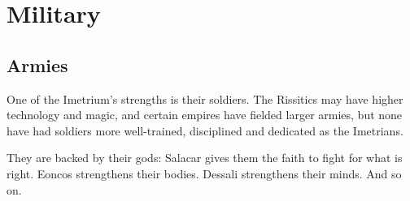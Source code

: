 \section{Military}





\subsection{Armies}
One of the Imetrium's strengths is their soldiers. 
The Rissitics may have higher technology and magic, and certain empires have fielded larger armies, but none have had soldiers more well-trained, disciplined and dedicated as the Imetrians. 

They are backed by their gods: 
Salacar gives them the faith to fight for what is right. 
Eoncos strengthens their bodies. 
Dessali strengthens their minds. 
And so on. 





